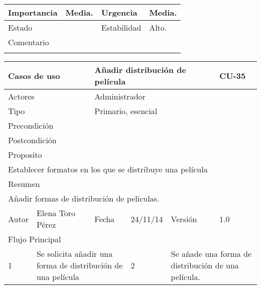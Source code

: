 \documentclass{article}
\begin{document}
\begin{table}[h]
\begin{tabular}{|l|l|l|l|l|l|}
\hline
\multicolumn{1}{|p{2cm}|}{Importancia} & \multicolumn{2}{p{3cm}}{Media.} & \multicolumn{1}{|p{2cm}|}{Urgencia} & \multicolumn{2}{p{3cm}|}{Media.}\\
\hline
\multicolumn{1}{|p{2cm}|}{Estado} & \multicolumn{2}{p{3cm}}{} & \multicolumn{1}{|p{2cm}|}{Estabilidad} & \multicolumn{2}{p{3cm}|}{Alto.}\\
\hline
\multicolumn{6}{|p{10cm}|}{Comentario}\\
\hline
\multicolumn{6}{|p{10cm}|}{}\\
\hline
\end{tabular}
\end{table}


\begin{table}[h]
\begin{tabular}{|l|l|l|l|l|l|}
\hline
\multicolumn{2}{|p{2cm}|}{Casos de uso}  & \multicolumn{3}{p{7cm}|}{Añadir distribución de película} & CU-35 \\
\hline
\multicolumn{2}{|p{2cm}|}{Actores}       & \multicolumn{4}{p{8cm}|}{Administrador}        \\
\hline
\multicolumn{2}{|p{2cm}|}{Tipo}          & \multicolumn{4}{p{8cm}|}{Primario, esencial}        \\
\hline
\multicolumn{2}{|p{2cm}|}{Precondición}  & \multicolumn{4}{p{8cm}|}{}        \\
\hline
\multicolumn{2}{|p{2cm}|}{Postcondición} & \multicolumn{4}{p{8cm}|}{}        \\
\hline
\multicolumn{6}{|p{10cm}|}{Proposito}                                   \\
\hline
\multicolumn{6}{|p{10cm}|}{Establecer formatos en los que se distribuye una película}                                            \\
\hline
\multicolumn{6}{|p{10cm}|}{Resumen}                                 \\
\hline
\multicolumn{6}{|p{10cm}|}{Añadir formas de distribución de peliculas.}                                            \\
\hline
Autor         &       Elena Toro Pérez       &  Fecha   &  24/11/14   &   Versión  & 1.0\\
\hline
\multicolumn{6}{|p{10cm}|}{Flujo Principal}\\
\hline
\multicolumn{1}{|p{1cm}|}{1} & \multicolumn{2}{p{3cm}}{Se solicita añadir una forma de distribución de una película} & \multicolumn{1}{|p{1cm}|}{2} & \multicolumn{2}{p{3cm}|}{Se añade una forma de distribución de una película.}\\

\end{tabular}
\end{table}
\end{document}
